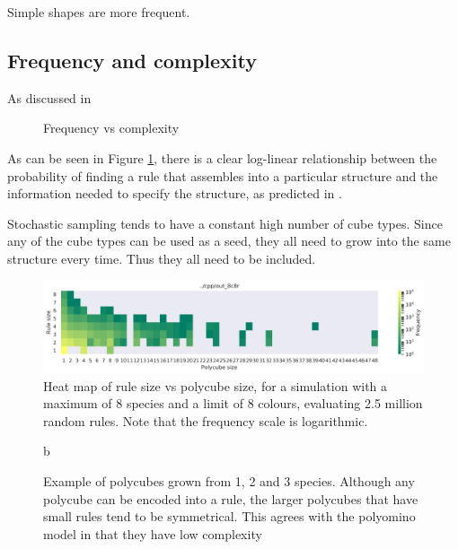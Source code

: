 Simple shapes are more frequent.

\subsection{Frequency and complexity}

As discussed in

\begin{figure}[h]
    \centering
    \centering
    \caption{Frequency vs complexity}
    \label{fig:freq_vs_compl}
\end{figure}

As can be seen in Figure \ref{fig:freq_vs_compl}, there is a clear log-linear relationship between the probability of finding a rule that assembles into a particular structure and the information needed to specify the structure, as predicted in \cite{dingle2018input, dingle2020generic}.

Stochastic sampling tends to have a constant high number of cube types. Since any of the cube types can be used as a seed, they all need to grow into the same structure every time. Thus they all need to be included.

\begin{figure}
    \centering\includegraphics[width=\textwidth]{figures/rs_vs_ps_8c8r.png}
    \caption{Heat map of rule size vs polycube size, for a simulation with a maximum of 8 species and a limit of 8 colours, evaluating 2.5 million random rules. Note that the frequency scale is logarithmic.}
    \label{fig:rs_vs_ps}
\end{figure}

\begin{figure}
    \caption{Example of polycubes grown from 1, 2 and 3 species. Although any polycube can be encoded into a rule, the larger polycubes that have small rules tend to be symmetrical. This agrees with the polyomino model in that they have low complexity}b
    \label{fig:poly_examples}
\end{figure}


